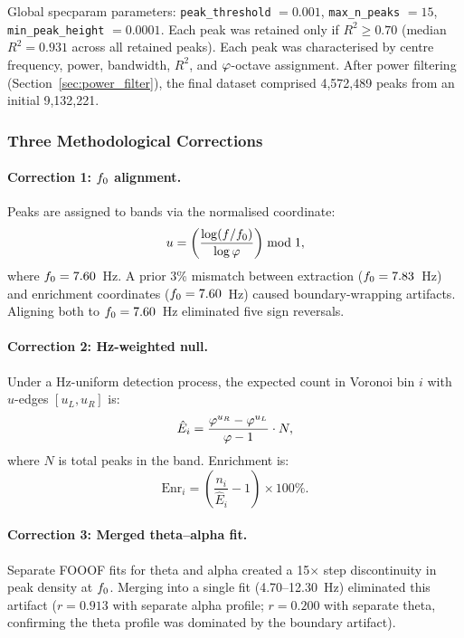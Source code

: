 Global specparam parameters: \texttt{peak\_threshold} $= 0.001$, \texttt{max\_n\_peaks} $= 15$, \texttt{min\_peak\_height} $= 0.0001$. Each peak was retained only if $R^2 \geq 0.70$ (median $R^2 = 0.931$ across all retained peaks). Each peak was characterised by centre frequency, power, bandwidth, $R^2$, and $\varphi$-octave assignment. After power filtering (Section~\ref{sec:power_filter}), the final dataset comprised 4,572,489 peaks from an initial 9,132,221.

\subsubsection{Three Methodological Corrections}
\label{sec:methods_corrections}

\paragraph{Correction 1: $f_0$ alignment.}
Peaks are assigned to bands via the normalised coordinate:
\begin{equation}
u = \left(\frac{\log(f / f_0)}{\log \varphi}\right) \bmod 1,
\label{eq:u_coord}
\end{equation}
where $f_0 = 7.60$~Hz. A prior 3\% mismatch between extraction ($f_0 = 7.83$~Hz) and enrichment coordinates ($f_0 = 7.60$~Hz) caused boundary-wrapping artifacts. Aligning both to $f_0 = 7.60$~Hz eliminated five sign reversals.

\paragraph{Correction 2: Hz-weighted null.}
Under a Hz-uniform detection process, the expected count in Voronoi bin $i$ with $u$-edges $[u_L, u_R]$ is:
\begin{equation}
\hat{E}_i = \frac{\varphi^{u_R} - \varphi^{u_L}}{\varphi - 1} \cdot N,
\label{eq:hz_weighted_null}
\end{equation}
where $N$ is total peaks in the band. Enrichment is:
\begin{equation}
\text{Enr}_i = \left(\frac{n_i}{\hat{E}_i} - 1\right) \times 100\%.
\label{eq:enrichment}
\end{equation}

\paragraph{Correction 3: Merged theta--alpha fit.}
Separate FOOOF fits for theta and alpha created a 15$\times$ step discontinuity in peak density at $f_0$. Merging into a single fit (4.70--12.30~Hz) eliminated this artifact ($r = 0.913$ with separate alpha profile; $r = 0.200$ with separate theta, confirming the theta profile was dominated by the boundary artifact).

